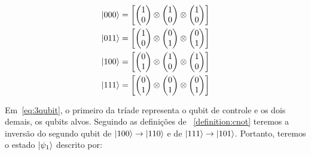 \begin{equation}\label{eq:3qubit}
	\begin{split}
\ket{000} &= \left[ \begin{pmatrix}
1 \\
0
\end{pmatrix} \otimes \begin{pmatrix}
1 \\
0
\end{pmatrix} \otimes \begin{pmatrix}
1 \\
0
\end{pmatrix}\right] \\
\ket{011} &= \left[ \begin{pmatrix}
1 \\
0
\end{pmatrix} \otimes \begin{pmatrix}
0 \\
1
\end{pmatrix} \otimes \begin{pmatrix}
0 \\
1
\end{pmatrix}\right] \\
\ket{100} &= \left[ \begin{pmatrix}
0 \\
1
\end{pmatrix} \otimes \begin{pmatrix}
1 \\
0
\end{pmatrix} \otimes \begin{pmatrix}
1 \\
0
\end{pmatrix}\right] \\
\ket{111} &=\left[ \begin{pmatrix}
0 \\
1
\end{pmatrix} \otimes \begin{pmatrix}
0 \\
1
\end{pmatrix} \otimes \begin{pmatrix}
0 \\
1
\end{pmatrix}\right]
	\end{split}
\end{equation}

Em~\eqref{eq:3qubit}, o primeiro da tríade representa o qubit de controle e os dois demais, os qubits alvos. Seguindo as definições de ~\ref{definition:cnot} teremos a inversão do segundo qubit de $\ket{100} \rightarrow \ket{110}$ e de $\ket{111} \rightarrow \ket{101}$. Portanto, teremos o estado $\ket{\psi_1}$ descrito por:

